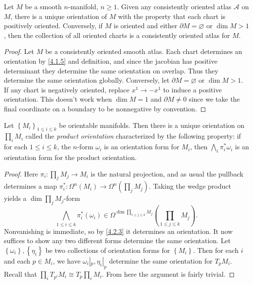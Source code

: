 \begin{proposition}\label{4.2.5}
	Let $M$ be a smooth $n$-manifold, $n\geq 1$. Given any consistently oriented atlas $\mathcal{A} $ on $M$, there is a unique orientation of $M$ with the property that each chart is positively oriented. Conversely, if $M$ is oriented and either $\partial M=\varnothing $ or $\dim M > 1$, then the collection of all oriented charts is a consistently oriented atlas for $M$.
\end{proposition}
\begin{proof}
	Let $M$ be a consistently oriented smooth atlas. Each chart determines an orientation by \cref{4.1.5} and definition, and since the jacobian has positive determinant they determine the same orientation on overlap. Thus they determine the same orientation globally. Conversely, let $\partial M=\varnothing $ or $\dim M>1$. If any chart is negatively oriented, replace $x^1 \to -x^1$ to induce a positive orientation. This doesn't work when $\dim M=1$ and $\partial M\neq 0$ since we take the final coordinate on a boundary to be nonnegative by convention.
\end{proof}
\begin{proposition}\label{4.2.6}
	Let $\left\{ M_i \right\} _{1\leq i\leq k} $ be orientable manifolds. Then there is a unique orientation on $\prod_{i} M_i$ called the \emph{product orientation} characterized by the following property: if for each $1\leq i\leq k$, the $n$-form $\omega _i$ is an orientation form for $M_i$, then $\bigwedge_i \pi _i^*\omega _i$ is an orientation form for the product orientation.
\end{proposition}
\begin{proof}
	Here $\pi _i : \prod_{j} M_j \to M_i$ is the natural projection, and as usual the pullback determines a map $\pi _i^* : \Omega ^n(M_i) \to \Omega ^{n} (\prod_{j} M_j)$. Taking the wedge product yields a $\dim \prod_{j} M_j$-form
	\[
		\bigwedge_{1\leq i\leq k} \pi _i^*(\omega _i)\in \Omega ^{\dim \prod_{1\leq j\leq k} M_j} \left( \prod_{1\leq j\leq k} M_j \right) 
	.\]
	Nonvanishing is immediate, so by \cref{4.2.3} it determines an orientation. It now suffices to show any two different forms determine the same orientation. Let $\left\{ \omega _i \right\} ,\left\{ \eta _i \right\} $ be two collections of orientation forms for $\left\{ M_i \right\} $. Then for each $i$ and each $p\in M_i$, we have $\omega _i|_p,\eta _i|_p$ determine the same orientation for $T_pM_i$. Recall that $\prod_{i} T_{p^i} M_i\cong T_p \prod_{i} M_i$. From here the argument is fairly trivial.
\end{proof}

